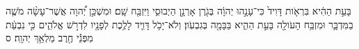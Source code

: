 \documentclass{openreader}
\begin{document}
בָּעֵ֣ת הַהִ֔יא בִּרְאֹ֤ות דָּוִיד֙ כִּי־עָנָ֣הוּ יְהוָ֔ה בְּגֹ֖רֶן אָרְנָ֣ן הַיְבוּסִ֑י וַיִּזְבַּ֖ח שָֽׁם׃ 
וּמִשְׁכַּ֣ן יְ֠הוָה אֲשֶׁר־עָשָׂ֨ה מֹשֶׁ֧ה בַמִּדְבָּ֛ר וּמִזְבַּ֥ח הָעֹולָ֖ה בָּעֵ֣ת הַהִ֑יא בַּבָּמָ֖ה בְּגִבְעֹֽון׃ 
וְלֹא־יָכֹ֥ל דָּוִ֛יד לָלֶ֥כֶת לְפָנָ֖יו לִדְרֹ֣שׁ אֱלֹהִ֑ים כִּ֣י נִבְעַ֔ת מִפְּנֵ֕י חֶ֖רֶב מַלְאַ֥ךְ יְהוָֽה׃ ס 
\end{document}
